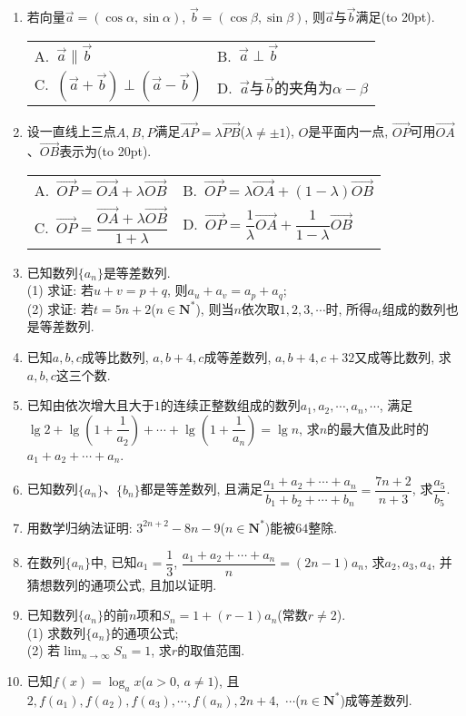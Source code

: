 \documentclass[10pt,a4paper]{article}
\newcommand{\bracket}[1]{(\hbox to #1pt{})}
\newcommand{\twoch}[4]{\par\begin{tabular}{p{.46\textwidth}p{.46\textwidth}}
A.~#1& B.~#2\\
C.~#3& D.~#4
\end{tabular}}
\newcommand{\fourch}[4]{\par\begin{tabular}{p{.23\textwidth}p{.23\textwidth}p{.23\textwidth}p{.23\textwidth}}
A.~#1 &B.~#2& C.~#3& D.~#4
\end{tabular}}
\begin{document}
\begin{enumerate}[1.]
\fourch{$a_n=3^{2n}$}{$a_n=3^{2(n-1)}$}{$a_n=3^{2^{n-1}}$}{$a_n=3^{2^n}$}
\item 若向量$\overrightarrow a=(\cos \alpha ,\sin \alpha)$, $\overrightarrow b=(\cos \beta ,\sin \beta)$, 则$\overrightarrow a$与$\overrightarrow b$满足\bracket{20}.
\twoch{$\overrightarrow a\parallel \overrightarrow b$}{$\overrightarrow a\perp \overrightarrow b$}{$(\overrightarrow a+\overrightarrow b)\perp (\overrightarrow a-\overrightarrow b)$}{$\overrightarrow a$与$\overrightarrow b$的夹角为$\alpha -\beta$}
\item 设一直线上三点$A,B,P$满足$\overrightarrow{AP}=\lambda \overrightarrow{PB}$($\lambda \ne \pm 1$), $O$是平面内一点, $\overrightarrow{OP}$可用$\overrightarrow{OA}$、$\overrightarrow{OB}$表示为\bracket{20}.
\twoch{$\overrightarrow{OP}=\overrightarrow{OA}+\lambda \overrightarrow{OB}$}{$\overrightarrow{OP}=\lambda \overrightarrow{OA}+(1-\lambda)\overrightarrow{OB}$}{$\overrightarrow{OP}=\dfrac{\overrightarrow{OA}+\lambda \overrightarrow{OB}}{1+\lambda }$}{$\overrightarrow{OP}=\dfrac 1{\lambda }\overrightarrow{OA}+\dfrac 1{1-\lambda }\overrightarrow{OB}$}
\item 已知数列$\{a_n\}$是等差数列.\\
(1) 求证: 若$u+v=p+q$, 则$a_u+a_v=a_p+a_q$;\\
(2) 求证: 若$t=5n+2$($n\in \mathbf{N}^*$), 则当$n$依次取$1, 2, 3, \cdots$时, 所得$a_t$组成的数列也是等差数列.
\item 已知$a,b,c$成等比数列, $a,b+4,c$成等差数列, $a,b+4,c+32$又成等比数列, 求$a,b,c$这三个数.
\item 已知由依次增大且大于$1$的连续正整数组成的数列$a_1,a_2,\cdots ,a_n,\cdots$, 满足$\lg 2+\lg (1+\dfrac 1{a_2})+\cdots +\lg (1+\dfrac 1{a_n})=\lg n$, 求$n$的最大值及此时的$a_1+a_2+\cdots +a_n$.
\item 已知数列$\{a_n\}$、$\{b_n\}$都是等差数列, 且满足$\dfrac{a_1+a_2+\cdots +a_n}{b_1+b_2+\cdots +b_n}=\dfrac{7n+2}{n+3}$, 求$\dfrac{a_5}{b_5}$.
\item 用数学归纳法证明: $3^{2n+2}-8n-9$($n\in \mathbf{N}^*$)能被$64$整除.
\item 在数列$\{a_n\}$中, 已知$a_1=\dfrac 13$, $\dfrac{a_1+a_2+\cdots +a_n}n=(2n-1)a_n$, 求$a_2,a_3,a_4$, 并猜想数列的通项公式, 且加以证明.
\item 已知数列$\{a_n\}$的前$n$项和$S_n=1+(r-1)a_n$(常数$r\ne 2$).\\
(1) 求数列$\{a_n\}$的通项公式;\\
(2) 若$\displaystyle\lim_{n\to\infty}S_n=1$, 求$r$的取值范围.
\item 已知$f(x)=\log _ax$($a>0$, $a\ne 1$), 且$2,f(a_1),f(a_2),f(a_3),\cdots ,f(a_n),2n+4,$ $\cdots $($n\in \mathbf{N}^*$)成等差数列.\\

\end{enumerate}
\end{document}
